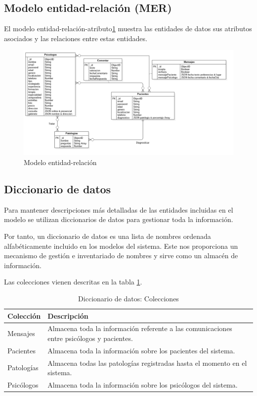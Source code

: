 \subsection{Modelo entidad-relación (MER)}
El modelo entidad-relación-atributo\ref{fig:mod_datos_mer} muestra las entidades de datos sus atributos asociados y las relaciones entre estas entidades. 


\begin{figure}[htbp] 
    \centering
    \includegraphics[width=1\textwidth]{figuras/bbdd_mod_MER.png}
    \caption{Modelo entidad-relación}
    \label{fig:mod_datos_mer}
\end{figure}

\subsection{Diccionario de datos}
Para mantener descripciones más detalladas de las entidades incluidas en el modelo se utilizan diccionarios de datos para gestionar toda la información.


Por tanto, un diccionario de datos es una lista de nombres ordenada alfabéticamente incluido en los modelos del sistema. Este nos proporciona un mecanismo de gestión e inventariado de nombres y sirve como un almacén de información.


Las colecciones vienen descritas en la tabla \ref{fig:dic_datos_colecciones}.

\begin{table}[htpb]
\centering
\begin{tabularx}{\textwidth}{|l|X|}
\hline
\textbf{Colección}  & \textbf{Descripción}                                                                               \\ \hline
Mensajes   & Almacena toda la información referente a las comunicaciones entre psicólogos y pacientes. \\ \hline
Pacientes  & Almacena toda la información sobre los pacientes del sistema.                             \\ \hline
Patologías & Almacena todas las patologías registradas hasta el momento en el sistema.                 \\ \hline
Psicólogos & Almacena toda la información sobre los psicólogos del sistema.                            \\ \hline
\end{tabularx}
\caption{Diccionario de datos: Colecciones}
\label{fig:dic_datos_colecciones}
\end{table}

